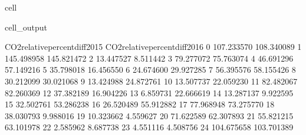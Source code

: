 \documentclass[letterpaper,10pt,english]{jupyterBook}
\begin{document}
\begin{sphinxuseclass}{cell}
\begin{sphinxVerbatimOutput}
\begin{sphinxuseclass}{cell_output}
\begin{sphinxVerbatim}[commandchars=\\\{\}]
    CO2\PYGZus{}relative\PYGZus{}percent\PYGZus{}diff\PYGZus{}2015  CO2\PYGZus{}relative\PYGZus{}percent\PYGZus{}diff\PYGZus{}2016  \PYGZbs{}
0                      \PYGZhy{}107.233570                     \PYGZhy{}108.340089   
1                      \PYGZhy{}145.498958                     \PYGZhy{}145.821472   
2                       \PYGZhy{}13.447527                       \PYGZhy{}8.511442   
3                        79.277072                       75.763074   
4                        46.691296                       57.149216   
5                       \PYGZhy{}35.798018                      \PYGZhy{}16.456550   
6                        24.674600                       29.927285   
7                        56.395576                       58.155426   
8                        30.212099                       30.021068   
9                       \PYGZhy{}13.424988                      \PYGZhy{}24.872761   
10                       13.507737                       22.059230   
11                       82.482067                       82.260369   
12                       37.382189                       16.904226   
13                       \PYGZhy{}6.859731                      \PYGZhy{}22.666619   
14                       13.287137                        9.922595   
15                       32.502761                       53.286238   
16                      \PYGZhy{}26.520489                      \PYGZhy{}55.912882   
17                       77.968948                       73.275770   
18                      \PYGZhy{}38.030793                       \PYGZhy{}9.988016   
19                       10.323662                       \PYGZhy{}4.559627   
20                      \PYGZhy{}71.622589                      \PYGZhy{}62.307893   
21                       55.821215                       63.101978   
22                        2.585962                       \PYGZhy{}8.687738   
23                        4.551116                        4.508756   
24                      104.675658                      103.701389   


\end{sphinxVerbatim}
\end{sphinxuseclass}
\end{sphinxVerbatimOutput}
\end{sphinxuseclass}
\end{document}
